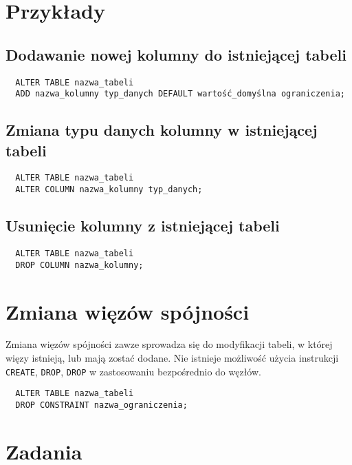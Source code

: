 \documentclass[a4paper]{article}
\begin{document}
\section{Przykłady}

\subsection{Dodawanie nowej kolumny do istniejącej tabeli}

\begin{verbatim}
  ALTER TABLE nazwa_tabeli
  ADD nazwa_kolumny typ_danych DEFAULT wartość_domyślna ograniczenia;
\end{verbatim}

\subsection{Zmiana typu danych kolumny w istniejącej tabeli}

\begin{verbatim}
  ALTER TABLE nazwa_tabeli
  ALTER COLUMN nazwa_kolumny typ_danych;
\end{verbatim}

\subsection{Usunięcie kolumny z istniejącej tabeli}

\begin{verbatim}
  ALTER TABLE nazwa_tabeli
  DROP COLUMN nazwa_kolumny;
\end{verbatim}

\section{Zmiana więzów spójności}

Zmiana więzów spójności zawze sprowadza się do modyfikacji tabeli, w której więzy istnieją,
lub mają zostać dodane. Nie istnieje możliwość użycia instrukcji \texttt{CREATE},
\texttt{DROP}, \texttt{DROP} w zastosowaniu bezpośrednio do węzłów.

\begin{verbatim}
  ALTER TABLE nazwa_tabeli
  DROP CONSTRAINT nazwa_ograniczenia;
\end{verbatim}

\section{Zadania}
\end{document}
